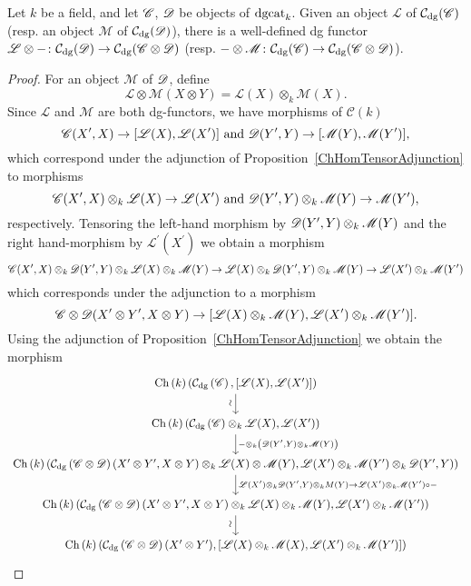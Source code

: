 \documentclass[dissertation.tex]{subfiles}
\begin{document}
\begin{lem}
  Let $k$ be a field, and let $\mathscr{C}$, $\mathscr{D}$ be objects of $\operatorname{dgcat}_k$.
  Given an object $\mathscr{L}$ of $\mathcal{C}_\text{dg}(\mathscr{C})$ (resp. an object $\mathscr{M}$ of $\mathcal{C}_\text{dg}(\mathscr{D})$), there is a well-defined dg functor $\mathscr{L} \otimes - \colon \mathcal{C}_\text{dg}(\mathscr{D}) \to \mathcal{C}_\text{dg}(\mathscr{C} \otimes \mathscr{D})$ (resp. $- \otimes \mathscr{M} \colon \mathcal{C}_\text{dg}(\mathscr{C}) \to \mathcal{C}_\text{dg}(\mathscr{C} \otimes \mathscr{D})$).
  

  \begin{proof}
    For an object $\mathscr{M}$ of $\mathscr{D}$, define 
    $$\mathscr{L} \otimes \mathscr{M}(X \otimes Y) = \mathscr{L}(X) \otimes_k \mathscr{M}(X).$$
    Since $\mathscr{L}$ and $\mathscr{M}$ are both dg-functors, we have morphisms of $\mathcal{C}(k)$
    $$\mathscr{C}(X^\prime, X) \to [\mathscr{L}(X), \mathscr{L}(X^\prime)]\ \text{and}\ \mathscr{D}(Y^\prime, Y) \to [\mathscr{M}(Y), \mathscr{M}(Y^\prime)],$$
    which correspond under the adjunction of Proposition~\ref{ChHomTensorAdjunction} to morphisms
    $$\CC(X^\prime, X) \otimes_k \mathscr{L}(X) \to \mathscr{L}(X^\prime)
    \ \text{and}\ 
    \D(Y^\prime, Y) \otimes_k \mathscr{M}(Y) \to \mathscr{M}(Y^\prime),$$
    respectively.
    Tensoring the left-hand morphism by $\mathscr{D}(Y^\prime,Y) \otimes_k \mathscr{M}(Y)$ and the right hand-morphism by $\mathscr{L^\prime}(X^\prime)$ we obtain a morphism
    $$\mathscr{C}(X^\prime, X) \otimes_k \mathscr{D}(Y^\prime, Y) \otimes_k \mathscr{L}(X) \otimes_k \mathscr{M}(Y) \to 
    \mathscr{L}(X) \otimes_k \mathscr{D}(Y^\prime,Y) \otimes_k \mathscr{M}(Y) \to
    \mathscr{L}(X^\prime) \otimes_k \mathscr{M}(Y^\prime)$$
    which corresponds under the adjunction to a morphism
    $$\mathscr{C} \otimes \mathscr{D}(X^\prime \otimes Y^\prime, X \otimes Y) \to
    [\mathscr{L}(X) \otimes_k \mathscr{M}(Y), \mathscr{L}(X^\prime) \otimes_k \mathscr{M}(Y^\prime)].$$
    Using the adjunction of Proposition~\ref{ChHomTensorAdjunction} we obtain the morphism
    $$\begin{tikzcd}
      \Ch{k}(\cdg{\CC}, [\funct{L}(X), \funct{L}(X^\prime)]) \arrow{d}[rotate=90,xshift=-1ex,yshift=1ex]{\sim}\\
      \Ch{k}(\cdg{\CC} \otimes_k \funct{L}(X), \funct{L}(X^\prime))\arrow{d}{- \otimes_k \left(\D(Y^\prime, Y) \otimes_k \funct{M}(Y)\right)}\\
      \Ch{k}(\cdg{\CC \otimes \D}(X^\prime \otimes Y^\prime, X \otimes Y) \otimes_k \funct{L}(X) \otimes \funct{M}(Y), \funct{L}(X^\prime) \otimes_k \funct{M}(Y^\prime) \otimes_k \D(Y^\prime, Y))
      \arrow{d}{\funct{L}(X^\prime) \otimes_k \D(Y^\prime,Y) \otimes_k M(Y) \to \funct{L}(X^\prime) \otimes_k \funct{M}(Y^\prime) \circ -}\\
      \Ch{k}(\cdg{\CC \otimes \D}(X^\prime \otimes Y^\prime, X \otimes Y) \otimes_k \funct{L}(X) \otimes_k \funct{M}(Y), \funct{L}(X^\prime) \otimes_k \funct{M}(Y^\prime))\arrow{d}[rotate=90,xshift=-1ex,yshift=1ex]{\sim}\\
      \Ch{k}(\cdg{\CC \otimes \D}(X^\prime \otimes Y^\prime), [\funct{L}(X) \otimes_k \funct{M}(X), \funct{L}(X^\prime) \otimes_k \funct{M}(Y^\prime)])
    \end{tikzcd}$$
  \end{proof}
\end{lem}
\end{document}
